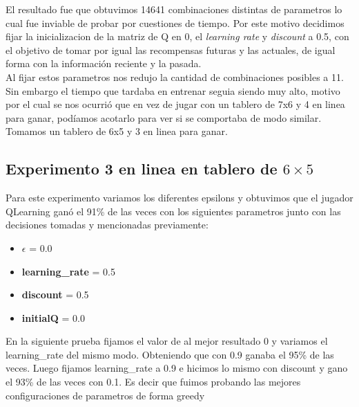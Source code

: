 El resultado fue que obtuvimos 14641 combinaciones distintas de parametros lo cual fue inviable de probar por cuestiones
 de tiempo. Por este motivo decidimos fijar la inicializacion de la matriz de Q en 0, el \textit{learning rate} y
  \textit{discount} a 0.5, con el objetivo de tomar por igual las recompensas futuras y las actuales, de igual forma
   con la información reciente y la pasada. \\

Al fijar estos parametros nos redujo la cantidad de combinaciones posibles a 11. Sin embargo el tiempo que tardaba en entrenar
 seguia siendo muy alto, motivo por el cual se nos ocurrió que en vez de jugar con un tablero de 7x6 y 4 en linea para ganar,
  podíamos acotarlo para ver si se comportaba de modo similar. Tomamos un tablero de 6x5 y 3 en linea para ganar.



\subsection{Experimento 3 en linea en tablero de $6\times5$}
Para este experimento variamos los diferentes epsilons y obtuvimos que el jugador QLearning ganó el 91\% de las veces con los
siguientes parametros junto con las decisiones tomadas y mencionadas previamente: \\

\begin{itemize}
  \item  \textbf{$\epsilon$} = 0.0
  \item \textbf{learning\_rate} = 0.5
  \item \textbf{discount} = 0.5
  \item \textbf{initialQ} = 0.0
\end{itemize}



En la siguiente prueba fijamos el valor de \epsilon al mejor resultado 0 y  variamos el learning\_rate del mismo modo.
Obteniendo que con 0.9 ganaba el 95\% de las veces. Luego fijamos learning\_rate a 0.9 e hicimos lo mismo con discount y
gano el 93\% de las veces con 0.1. Es decir que fuimos probando las mejores configuraciones de parametros de forma greedy \\

